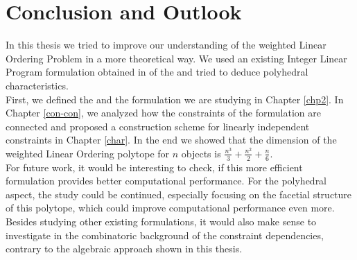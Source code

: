\chapter{Conclusion and Outlook}\label{chp:conclusion}

In this thesis we tried to improve our understanding of the weighted Linear Ordering Problem \wLOPN in a more theoretical way. We used an existing Integer Linear Program \ILPN formulation obtained in \cite{gor19} of the \wLOP and tried to deduce polyhedral characteristics. \\


First, we defined the \wLOP and the \ILP formulation we are studying in Chapter \ref{chp2}. In Chapter \ref{con-con}, we analyzed how the constraints of the \ILP formulation are connected and proposed a construction scheme for linearly independent constraints in Chapter \ref{char}. In the end we showed that the dimension of the weighted Linear Ordering polytope for $n$ objects is $\frac{n^3}{3}+ \frac{n^2}{2} + \frac{n}{6}$.\\

For future work, it would be interesting to check, if this more efficient \ILP formulation provides better computational performance. For the polyhedral aspect, the study could be continued, especially focusing on the facetial structure of this polytope, which could improve computational performance even more. Besides studying other existing \ILP formulations, it would also make sense to investigate in the combinatoric background of the constraint dependencies, contrary to the algebraic approach shown in this thesis.


